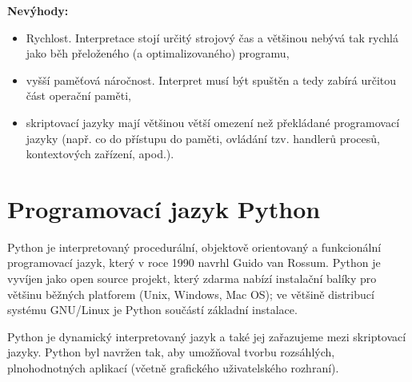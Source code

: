 \noindent
{\textbf{Nevýhody:}}
\begin{itemize}

\item Rychlost. Interpretace stojí určitý strojový čas a většinou nebývá tak rychlá jako běh přeloženého (a optimalizovaného) programu,
\item vyšší paměťová náročnost. Interpret musí být spuštěn a tedy zabírá určitou část operační paměti,
\item skriptovací jazyky mají většinou větší omezení než překládané programovací jazyky (např. co do přístupu do paměti, ovládání tzv. handlerů procesů, kontextových zařízení, apod.).
\end{itemize}







\section{Programovací jazyk Python}
Python je interpretovaný procedurální, objektově orientovaný a funkcio\-nál\-ní programovací jazyk, který v roce 1990 navrhl Guido van Rossum. Python je vyvíjen jako open source projekt, který zdarma nabízí instalační balíky pro většinu běžných platforem (Unix, Windows, Mac OS); ve většině distribucí systému GNU/Linux je Python součástí základní instalace.

Python je dynamický interpretovaný jazyk a také jej zařazujeme mezi skriptovací jazyky. Python byl navržen tak, aby umožňoval tvorbu roz\-sáhlých, plnohodnotných aplikací (včetně grafického uživatelského rozhraní).

